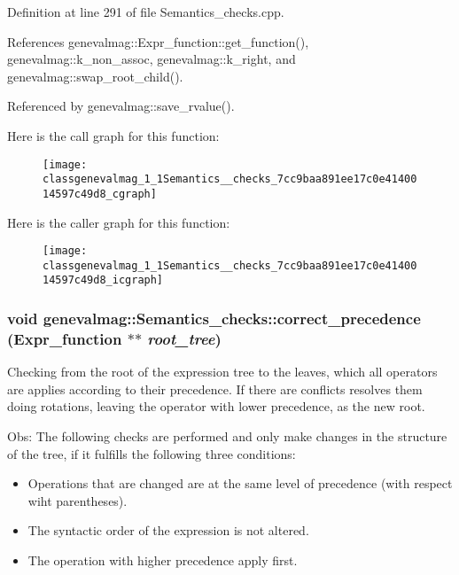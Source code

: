 Definition at line 291 of file Semantics\_\-checks.cpp.

References genevalmag::Expr\_\-function::get\_\-function(), genevalmag::k\_\-non\_\-assoc, genevalmag::k\_\-right, and genevalmag::swap\_\-root\_\-child().

Referenced by genevalmag::save\_\-rvalue().

Here is the call graph for this function:\nopagebreak
\begin{figure}[H]
\begin{center}
\leavevmode
\texttt{[image: classgenevalmag\_1\_1Semantics\_\_checks\_7cc9baa891ee17c0e4140014597c49d8\_cgraph]}
\end{center}
\end{figure}


Here is the caller graph for this function:\nopagebreak
\begin{figure}[H]
\begin{center}
\leavevmode
\texttt{[image: classgenevalmag\_1\_1Semantics\_\_checks\_7cc9baa891ee17c0e4140014597c49d8\_icgraph]}
\end{center}
\end{figure}
\hypertarget{classgenevalmag_1_1Semantics__checks_5ad77ec398637204eea7e88b5d4fa74e}{
\subsubsection[{correct\_\-precedence}]{\setlength{\rightskip}{0pt plus 5cm}void genevalmag::Semantics\_\-checks::correct\_\-precedence ({\bf Expr\_\-function} $\ast$$\ast$ {\em root\_\-tree})}}
\label{classgenevalmag_1_1Semantics__checks_5ad77ec398637204eea7e88b5d4fa74e}


Checking from the root of the expression tree to the leaves, which all operators are applies according to their precedence. If there are conflicts resolves them doing rotations, leaving the operator with lower precedence, as the new root.

Obs: The following checks are performed and only make changes in the structure of the tree, if it fulfills the following three conditions:

\begin{itemize}
\item Operations that are changed are at the same level of precedence (with respect wiht parentheses).\item The syntactic order of the expression is not altered.\item The operation with higher precedence apply first.\end{itemize}


